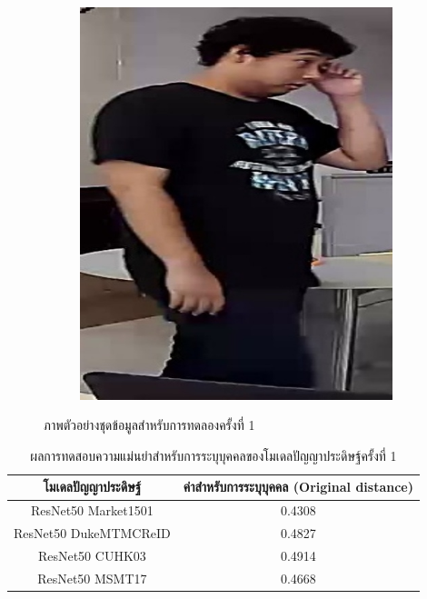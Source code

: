 \begin{figure}[!ht]
\begin{subfigure}[b]{0.2\textwidth}
        \includegraphics[width=\textwidth]{chapter4/images/o_1.jpg}
        \label{fig:ex_2}
    \end{subfigure}
    \caption{ภาพตัวอย่างชุดข้อมูลสำหรับการทดลองครั้งที่ 1}
    \label{fig: ภาพตัวอย่างชุดข้อมูลสำหรับการทดลอง 1}
\end{figure}

\begin{table}[!ht]
    \centering
    \begin{tabular}{|c|c|}
        \hline
        {โมเดลปัญญาประดิษฐ์}&{ค่าสำหรับการระบุบุคคล (Original distance)}							\\
        \hline
        ResNet50 Market1501	 			& 0.4308								\\
        ResNet50 DukeMTMCReID			& 0.4827								\\
        ResNet50 CUHK03				& 0.4914								\\
        ResNet50 MSMT17				& 0.4668								\\
        \hline
    \end{tabular}
    \caption{ผลการทดสอบความแม่นยำสำหรับการระบุบุคคลของโมเดลปัญญาประดิษฐ์ครั้งที่ 1}
    \label{tab: Original distant of image 1}
\end{table}

